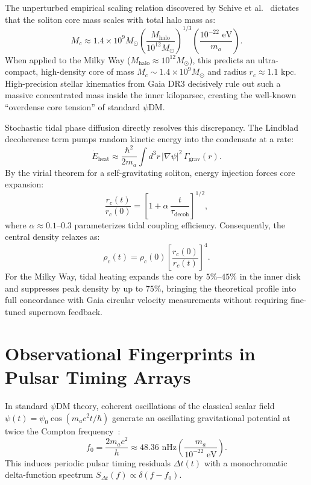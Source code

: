 \documentclass[aps,prd,twocolumn,superscriptaddress,nofootinbib,floatfix,longbibliography]{revtex4-2}
\begin{document}
The unperturbed empirical scaling relation discovered by Schive et al.~\cite{Schive2014} dictates that the soliton core mass scales with total halo mass as:
\begin{equation}
M_c \approx 1.4 \times 10^9 M_\odot \left( \frac{M_{\text{halo}}}{10^{12} M_\odot} \right)^{1/3} \left( \frac{10^{-22}\text{ eV}}{m_a} \right).
\end{equation}
When applied to the Milky Way ($M_{\text{halo}} \approx 10^{12} M_\odot$), this predicts an ultra-compact, high-density core of mass $M_c \sim 1.4 \times 10^9 M_\odot$ and radius $r_c \approx 1.1\text{ kpc}$. High-precision stellar kinematics from Gaia DR3 decisively rule out such a massive concentrated mass inside the inner kiloparsec, creating the well-known ``overdense core tension'' of standard $\psi\text{DM}$.

Stochastic tidal phase diffusion directly resolves this discrepancy. The Lindblad decoherence term pumps random kinetic energy into the condensate at a rate:
\begin{equation}
\dot{E}_{\text{heat}} \approx \frac{\hbar^2}{2 m_a} \int d^3r \, |\nabla \psi|^2 \, \Gamma_{\text{grav}}(r).
\end{equation}
By the virial theorem for a self-gravitating soliton, energy injection forces core expansion:
\begin{equation}
\frac{r_c(t)}{r_c(0)} = \left[ 1 + \alpha \, \frac{t}{\tau_{\text{decoh}}} \right]^{1/2},
\end{equation}
where $\alpha \approx 0.1\text{--}0.3$ parameterizes tidal coupling efficiency. Consequently, the central density relaxes as:
\begin{equation}
\rho_c(t) = \rho_c(0) \left[ \frac{r_c(0)}{r_c(t)} \right]^4.
\end{equation}
For the Milky Way, tidal heating expands the core by $5\%\text{--}45\%$ in the inner disk and suppresses peak density by up to $75\%$, bringing the theoretical profile into full concordance with Gaia circular velocity measurements without requiring fine-tuned supernova feedback.

\section{Observational Fingerprints in Pulsar Timing Arrays}
\label{sec:pta}

In standard $\psi\text{DM}$ theory, coherent oscillations of the classical scalar field $\psi(t) = \psi_0 \cos(m_a c^2 t / \hbar)$ generate an oscillating gravitational potential at twice the Compton frequency~\cite{Hui2017}:
\begin{equation}
f_0 = \frac{2 m_a c^2}{h} \approx 48.36\text{ nHz} \left( \frac{m_a}{10^{-22}\text{ eV}} \right).
\end{equation}
This induces periodic pulsar timing residuals $\Delta t(t)$ with a monochromatic delta-function spectrum $S_{\Delta t}(f) \propto \delta(f - f_0)$.
\end{document}
